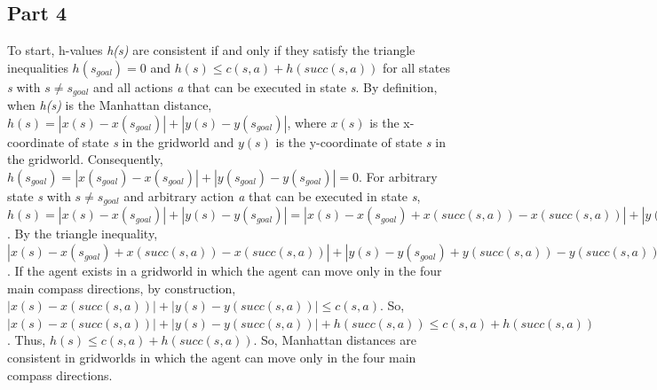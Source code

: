\documentclass{article}
\begin{document}
\subsection*{Part 4}
To start, h-values \textit{h(s)} are consistent if and only if they satisfy the triangle inequalities $h(s_{goal}) = 0$ and $h(s) \leq c(s,a) + h(succ(s,a))$ for all states \textit{s} with $s \neq s_{goal}$ and all actions \textit{a} that can be executed in state \textit{s}. By definition, when \textit{h(s)} is the Manhattan distance, $h(s) = |x(s)-x(s_{goal})| + |y(s)-y(s_{goal})|$, where $x(s)$ is the x-coordinate of state \textit{s} in the gridworld and $y(s)$ is the y-coordinate of state \textit{s} in the gridworld. Consequently, $h(s_{goal}) = |x(s_{goal})-x(s_{goal})| + |y(s_{goal})-y(s_{goal})| = 0$. For arbitrary state \textit{s} with $s \neq s_{goal}$ and arbitrary action \textit{a} that can be executed in state \textit{s}, $h(s) = |x(s)-x(s_{goal})| + |y(s)-y(s_{goal})| = |x(s)-x(s_{goal})+x(succ(s,a))-x(succ(s,a))| + |y(s)-y(s_{goal})+y(succ(s,a))-y(succ(s,a))|$. By the triangle inequality, $|x(s)-x(s_{goal})+x(succ(s,a))-x(succ(s,a))| + |y(s)-y(s_{goal})+y(succ(s,a))-y(succ(s,a))| \leq |x(s)-x(succ(s,a))| + |x(succ(s,a))-x(s_{goal})| + |y(s)-y(succ(s,a))| + |y(succ(s,a))-y(s_{goal})| = |x(s)-x(succ(s,a))| + |y(s)-y(succ(s,a))| + h(succ(s,a))$. If the agent exists in a gridworld in which the agent can move only in the four main compass directions, by construction, $|x(s)-x(succ(s,a))| + |y(s)-y(succ(s,a))| \leq c(s,a)$. So, $|x(s)-x(succ(s,a))| + |y(s)-y(succ(s,a))| + h(succ(s,a)) \leq c(s,a) + h(succ(s,a))$. Thus, $h(s) \leq c(s,a) + h(succ(s,a))$. So, Manhattan distances are consistent in gridworlds in which the agent can move only in the four main compass directions.     
\newline
\newline
\noindent
\end{document}
